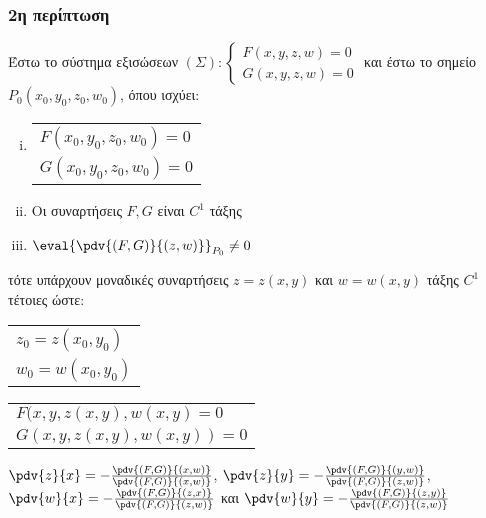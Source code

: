 \documentclass[a4paper,table]{report}
\begin{document}
\subsubsection{2η περίπτωση}

Έστω το σύστημα εξισώσεων $(\Sigma):
\begin{cases}
  F(x,y,z,w) = 0  \\
  G(x,y,z,w) = 0
\end{cases}$
και έστω το σημείο $ P_0(x_0,y_0,z_0,w_0) $, όπου ισχύει:
\begin{enumerate}[(i)]
  \item  \begin{tabular}{l}
      $F(x_0,y_0,z_0,w_0) = 0$ \\
      $G(x_0,y_0,z_0,w_0) = 0$
    \end{tabular}
  \item Οι συναρτήσεις $ F, G $ είναι $ C^{1} $ τάξης 
  \item $ \eval{\pdv{(F,G)}{(z,w)}}_{P_0} \neq 0 $ 
\end{enumerate}
τότε υπάρχουν μοναδικές συναρτήσεις $ z = z(x,y) $ και $ w = w(x,y) $ τάξης 
$ C^{1} $ τέτοιες ώστε:
\begin{myitemize}
  \item \begin{tabular}{l}
      $ z_0 = z(x_0,y_0) $ \\
      $ w_0 = w(x_0,y_0) $
    \end{tabular}
  \item \begin{tabular}{l}
      $ F(x,y,z(x,y), w(x,y) = 0 $ \\
      $ G(x,y,z(x,y), w(x,y)) = 0 $
    \end{tabular}
  \item $ \pdv{z}{x} = - \frac{\pdv{(F,G)}{(x,w)}}{\pdv{(F,G)}{(x,w)}} $, 
    \; $ \pdv{z}{y} = - \frac{\pdv{(F,G)}{(y,w)}}{\pdv{(F,G)}{(z,w)}} $, 
    \; $ \pdv{w}{x} = - \frac{\pdv{(F,G)}{(z,x)}}{\pdv{(F,G)}{(z,w)}} $ και 
    $ \pdv{w}{y} = - \frac{\pdv{(F,G)}{(z,y)}}{\pdv{(F,G)}{(z,w)}} $
\end{myitemize}
\end{document}

